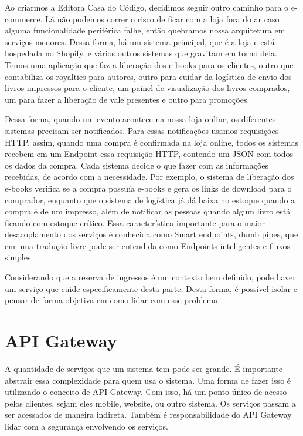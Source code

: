 \begin{citacao}

Ao criarmos a Editora Casa do Código, decidimos seguir outro caminho para o e-commerce.
Lá não podemos correr o risco de ficar com a loja fora do ar caso alguma funcionalidade
periférica falhe, então quebramos nossa arquitetura em serviços menores. Dessa forma, há
um sistema principal, que é a loja e está hospedada no Shopify, e vários outros sistemas
que gravitam em torno dela. Temos uma aplicação que faz a liberação dos e-books para os
clientes, outro que contabiliza os royalties para autores, outro para cuidar da logística
de envio dos livros impressos para o cliente, um painel de visualização dos livros comprados,
um para fazer a liberação de vale presentes e outro para promoções.

Dessa forma, quando um evento acontece na nossa loja online, os diferentes sistemas precisam
ser notificados. Para essas notificações usamos requisições HTTP, assim, quando uma compra
é confirmada na loja online, todos os sistemas recebem em um Endpoint essa requisição HTTP,
contendo um JSON com todos os dados da compra. Cada sistema decide o que fazer com as informações
recebidas, de acordo com a necessidade. Por exemplo, o sistema de liberação dos e-books verifica
se a compra possuía e-books e gera os links de download para o comprador, enquanto que o sistema
de logística já dá baixa no estoque quando a compra é de um impresso, além de notificar as pessoas
quando algum livro está ficando com estoque crítico. Essa característica importante para o maior
desacoplamento dos serviços é conhecida como Smart endpoints, dumb pipes, que em uma tradução
livre pode ser entendida como Endpoints inteligentes e fluxos
simples \cite{arquitetura-de-microservicos-ou-monolitica}.

\end{citacao}


Considerando que a reserva de ingressos é um contexto bem definido, pode haver um serviço que cuide
especificamente desta parte. Desta forma, é possível isolar e pensar de forma objetiva em como
lidar com esse problema.

\section{API Gateway}\label{api-gateway}

A quantidade de serviços que um sistema tem pode ser grande.
É importante abstrair essa complexidade para quem usa o sistema.
Uma forma de fazer isso é utilizando o conceito de API Gateway.
Com isso, há um ponto único de acesso pelos clientes, sejam eles
mobile, website, ou outro sistema.
Os serviços passam a ser acessados de maneira indireta.
Também é responsabilidade do API Gateway lidar com a segurança
envolvendo os serviços.

